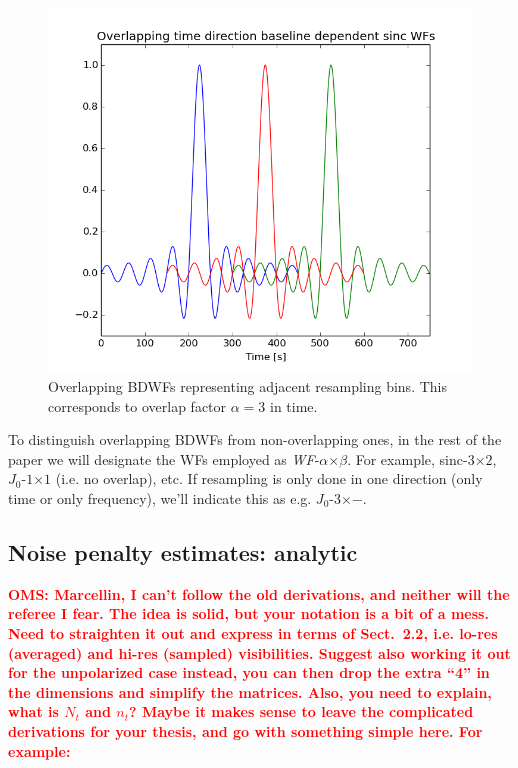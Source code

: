 \documentclass[useAMS,usenatbib]{mn2e}
\newcommand{\OMS}[1]{\textcolor{red}{{\bf OMS: #1}}}
\begin{document}
\begin{figure} 
\includegraphics[width=\columnwidth]{./Figures/corrSigVLAMxBl_overlapGdelta.png}\caption{Overlapping 
BDWFs representing adjacent resampling bins. This corresponds to overlap factor $\alpha=3$ in time.}\label{fig:overlap}
\end{figure}

\newcommand{\WF}[3]{{#1}-$#2${}$\times${}$#3$}

To distinguish overlapping BDWFs from non-overlapping ones, in the rest of the paper we will designate the 
WFs employed as \WF{\em WF}{\alpha}{\beta}. For example, \WF{sinc}{3}{2}, \WF{$J_0$}{1}{1} (i.e. no overlap), etc.
If resampling is only done in one direction (only time or only frequency), we'll indicate this as e.g. \WF{$J_0$}{3}{-}.

\subsection{Noise penalty estimates: analytic}
\label{sec:imaging}

\OMS{Marcellin, I can't follow the old derivations, and neither will the referee I fear. 
The idea is solid, but your notation is a bit of a mess. Need to straighten it out
and express in terms of Sect.~2.2, i.e. lo-res (averaged) and hi-res (sampled) visibilities. 
Suggest also working it out for the unpolarized case instead, you can then drop the 
extra ``4'' in the dimensions and simplify the matrices. Also, you need to explain, what is $N_t$ and $n_t$? 
Maybe it makes sense to leave the complicated derivations for your thesis, and go with something simple here. 
For example:}
\end{document}
